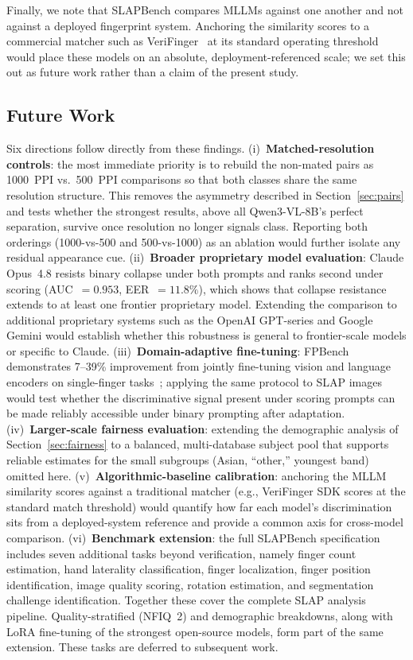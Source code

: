 \documentclass[journal]{IEEEtran}
\begin{document}
Finally, we note that SLAPBench compares MLLMs against one another and not
against a deployed fingerprint system. Anchoring the similarity scores to a
commercial matcher such as VeriFinger~\cite{verifinger} at its standard
operating threshold would place these models on an absolute,
deployment-referenced scale; we set this out as future work rather than a
claim of the present study.

\subsection{Future Work}

Six directions follow directly from these findings.
(i)~\textbf{Matched-resolution controls}: the most immediate priority is
to rebuild the non-mated pairs as 1000~PPI vs.\ 500~PPI comparisons so
that both classes share the same resolution structure. This removes the
asymmetry described in Section~\ref{sec:pairs} and tests whether the
strongest results, above all Qwen3-VL-8B's perfect separation, survive once
resolution no longer signals class.
Reporting both orderings (1000-vs-500 and 500-vs-1000) as an ablation
would further isolate any residual appearance cue.
(ii)~\textbf{Broader proprietary model evaluation}: Claude Opus~4.8 resists
binary collapse under both prompts and ranks second under scoring
(AUC~$= 0.953$, EER~$= 11.8\%$), which shows that collapse resistance
extends to at least one frontier proprietary model. Extending the
comparison to additional proprietary systems such as the OpenAI GPT-series
and Google Gemini would establish whether this robustness is general to
frontier-scale models or specific to Claude.
(iii)~\textbf{Domain-adaptive fine-tuning}: FPBench demonstrates
7--39\% improvement from jointly fine-tuning vision and language
encoders on single-finger tasks~\cite{fpbench2025}; applying the
same protocol to SLAP images would test whether the discriminative
signal present under scoring prompts can be made reliably accessible
under binary prompting after adaptation.
(iv)~\textbf{Larger-scale fairness evaluation}: extending the
demographic analysis of Section~\ref{sec:fairness} to a balanced,
multi-database subject pool that supports reliable estimates for the
small subgroups (Asian, ``other,'' youngest band) omitted here.
(v)~\textbf{Algorithmic-baseline calibration}: anchoring the MLLM
similarity scores against a traditional matcher (e.g., VeriFinger SDK
scores at the standard match threshold) would quantify how far each
model's discrimination sits from a deployed-system reference and provide
a common axis for cross-model comparison.
(vi)~\textbf{Benchmark extension}: the full SLAPBench specification
includes seven additional tasks beyond verification, namely finger count
estimation, hand laterality classification, finger localization, finger
position identification, image quality scoring, rotation estimation, and
segmentation challenge identification. Together these cover the complete
SLAP analysis pipeline. Quality-stratified (NFIQ~2) and demographic
breakdowns, along with LoRA fine-tuning of the strongest open-source
models, form part of the same extension.
These tasks are deferred to subsequent work.
\end{document}
